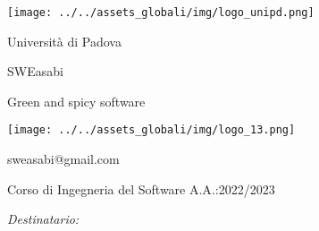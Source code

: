 \documentclass{article}
\begin{document}
\begin{center}
    \begin{minipage}{0.49\linewidth}
        \begin{flushleft}

        \begin{minipage}{0.5\linewidth}
        \begin{center}
        \texttt{[image: ../../assets\_globali/img/logo\_unipd.png]}
        
        \normalsize Università di Padova
        
        \end{center}
        \end{minipage}
        \end{flushleft}
    \end{minipage}
    \begin{minipage}{0.49\linewidth}
        \begin{flushright}

        \begin{minipage}{0.5\linewidth}
        \begin{center}

        \Large SWEasabi

        \tiny Green and spicy software

        \texttt{[image: ../../assets\_globali/img/logo\_13.png]}
        
        \small sweasabi@gmail.com

        \end{center}
        \end{minipage}
        \end{flushright}
    \end{minipage}

    \vspace{1cm}

    Corso di Ingegneria del Software A.A.:2022/2023
    
    \vspace{2cm}

    \begin{minipage}[t]{0.49\linewidth}
        \begin{flushleft}

        \begin{minipage}[t]{0.8\linewidth}
        \begin{flushleft}
        
            \normalsize
            \textit{Destinatario:}
            \vspace{0.5cm}


\end{flushleft}
\end{minipage}
\end{flushleft}
\end{minipage}
\end{center}
\end{document}
